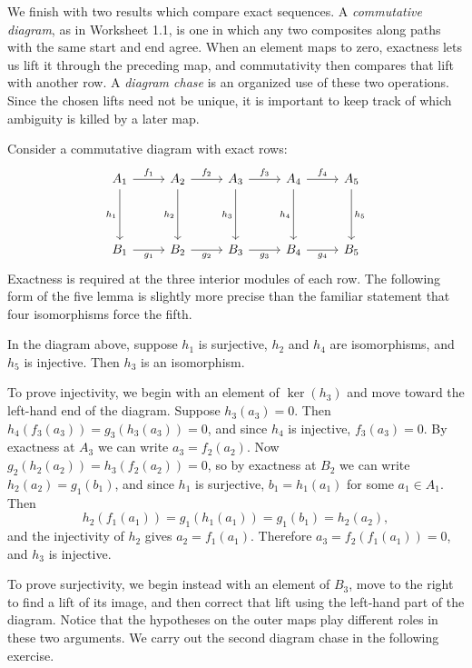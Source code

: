 \documentclass[12pt,reqno]{amsart}
\begin{document}
\hrulefill

We finish with two results which compare exact sequences. A \emph{commutative diagram}, as in Worksheet 1.1, is one in which any two composites along paths with the same start and end agree. When an element maps to zero, exactness lets us lift it through the preceding map, and commutativity then compares that lift with another row. A \emph{diagram chase} is an organized use of these two operations. Since the chosen lifts need not be unique, it is important to keep track of which ambiguity is killed by a later map.

Consider a commutative diagram with exact rows:
\[
\begin{tikzcd}[column sep=2.5em,row sep=4em]
A_1\arrow[r,"f_1"]\arrow[d,"h_1"']&A_2\arrow[r,"f_2"]\arrow[d,"h_2"']&A_3\arrow[r,"f_3"]\arrow[d,"h_3"']&A_4\arrow[r,"f_4"]\arrow[d,"h_4"']&A_5\arrow[d,"h_5"]\\
B_1\arrow[r,"g_1"']&B_2\arrow[r,"g_2"']&B_3\arrow[r,"g_3"']&B_4\arrow[r,"g_4"']&B_5
\end{tikzcd}
\]
Exactness is required at the three interior modules of each row. The following form of the five lemma is slightly more precise than the familiar statement that four isomorphisms force the fifth.

\begin{theorem}
In the diagram above, suppose $h_1$ is surjective, $h_2$ and $h_4$ are isomorphisms, and $h_5$ is injective. Then $h_3$ is an isomorphism.
\end{theorem}

To prove injectivity, we begin with an element of $\ker(h_3)$ and move toward the left-hand end of the diagram. Suppose $h_3(a_3)=0$. Then $h_4(f_3(a_3))=g_3(h_3(a_3))=0$, and since $h_4$ is injective, $f_3(a_3)=0$. By exactness at $A_3$ we can write $a_3=f_2(a_2)$. Now $g_2(h_2(a_2))=h_3(f_2(a_2))=0$, so by exactness at $B_2$ we can write $h_2(a_2)=g_1(b_1)$, and since $h_1$ is surjective, $b_1=h_1(a_1)$ for some $a_1\in A_1$. Then
\[
h_2(f_1(a_1))=g_1(h_1(a_1))=g_1(b_1)=h_2(a_2),
\]
and the injectivity of $h_2$ gives $a_2=f_1(a_1)$. Therefore $a_3=f_2(f_1(a_1))=0$, and $h_3$ is injective.

To prove surjectivity, we begin instead with an element of $B_3$, move to the right to find a lift of its image, and then correct that lift using the left-hand part of the diagram. Notice that the hypotheses on the outer maps play different roles in these two arguments. We carry out the second diagram chase in the following exercise.
\end{document}
